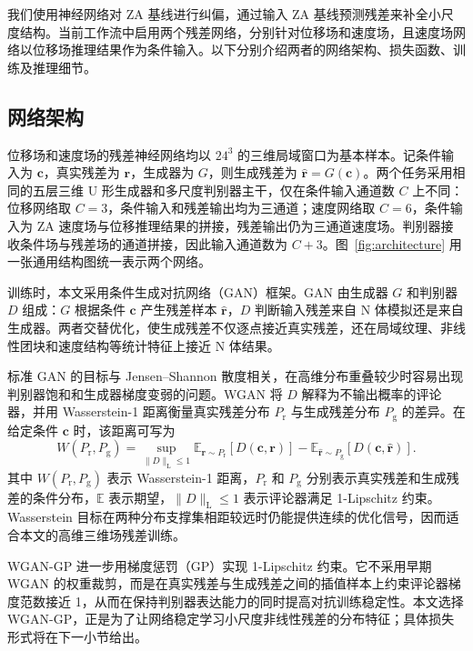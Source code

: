 我们使用神经网络对 ZA 基线进行纠偏，通过输入 ZA 基线预测残差来补全小尺度结构。当前工作流中启用两个残差网络，分别针对位移场和速度场，且速度场网络以位移场推理结果作为条件输入。以下分别介绍两者的网络架构、损失函数、训练及推理细节。

\subsection{网络架构}

位移场和速度场的残差神经网络均以 $24^3$ 的三维局域窗口为基本样本。记条件输入为 $\boldsymbol{c}$，真实残差为 $\boldsymbol{r}$，生成器为 $G$，则生成残差为 $\hat{\boldsymbol{r}}=G(\boldsymbol{c})$。两个任务采用相同的五层三维 U 形生成器和多尺度判别器主干，仅在条件输入通道数 $C$ 上不同：位移网络取 $C=3$，条件输入和残差输出均为三通道；速度网络取 $C=6$，条件输入为 ZA 速度场与位移推理结果的拼接，残差输出仍为三通道速度场。判别器接收条件场与残差场的通道拼接，因此输入通道数为 $C+3$。图~\ref{fig:architecture} 用一张通用结构图统一表示两个网络。

训练时，本文采用条件生成对抗网络（GAN）框架\citep{goodfellow2014generative}。GAN 由生成器 $G$ 和判别器 $D$ 组成：$G$ 根据条件 $\boldsymbol{c}$ 产生残差样本 $\hat{\boldsymbol{r}}$，$D$ 判断输入残差来自 N 体模拟还是来自生成器。两者交替优化，使生成残差不仅逐点接近真实残差，还在局域纹理、非线性团块和速度结构等统计特征上接近 N 体结果。

标准 GAN 的目标与 Jensen--Shannon 散度相关，在高维分布重叠较少时容易出现判别器饱和和生成器梯度变弱的问题。WGAN 将 $D$ 解释为不输出概率的评论器，并用 Wasserstein-1 距离衡量真实残差分布 $P_{\mathrm{r}}$ 与生成残差分布 $P_{\mathrm{g}}$ 的差异\citep{arjovsky2017wasserstein}。在给定条件 $\boldsymbol{c}$ 时，该距离可写为
\begin{equation}
  W(P_{\mathrm{r}},P_{\mathrm{g}})=
  \sup_{\|D\|_{\mathrm{L}}\leq 1}
  \mathbb{E}_{\boldsymbol{r}\sim P_{\mathrm{r}}}[D(\boldsymbol{c},\boldsymbol{r})]
  -\mathbb{E}_{\hat{\boldsymbol{r}}\sim P_{\mathrm{g}}}[D(\boldsymbol{c},\hat{\boldsymbol{r}})].
\end{equation}
其中 $W(P_{\mathrm{r}},P_{\mathrm{g}})$ 表示 Wasserstein-1 距离，$P_{\mathrm{r}}$ 和 $P_{\mathrm{g}}$ 分别表示真实残差和生成残差的条件分布，$\mathbb{E}$ 表示期望，$\|D\|_{\mathrm{L}}\leq1$ 表示评论器满足 1-Lipschitz 约束。Wasserstein 目标在两种分布支撑集相距较远时仍能提供连续的优化信号，因而适合本文的高维三维场残差训练。

WGAN-GP 进一步用梯度惩罚（GP）实现 1-Lipschitz 约束\citep{gulrajani2017improved}。它不采用早期 WGAN 的权重裁剪，而是在真实残差与生成残差之间的插值样本上约束评论器梯度范数接近 1，从而在保持判别器表达能力的同时提高对抗训练稳定性。本文选择 WGAN-GP，正是为了让网络稳定学习小尺度非线性残差的分布特征；具体损失形式将在下一小节给出。

